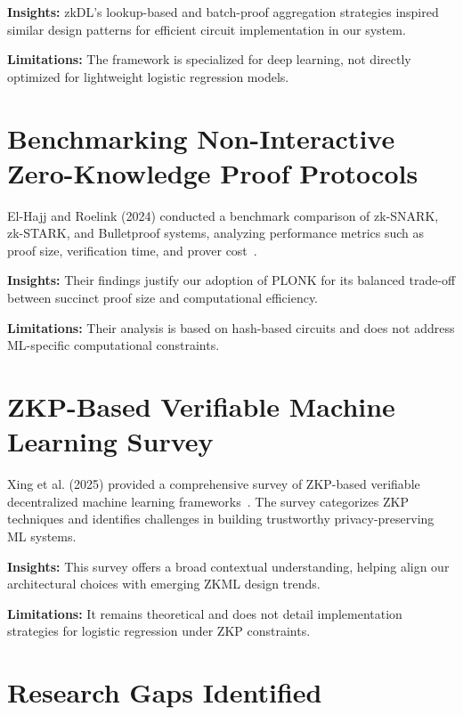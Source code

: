 \textbf{Insights:}  
zkDL’s lookup-based and batch-proof aggregation strategies inspired similar design patterns for efficient circuit implementation in our system.

\textbf{Limitations:}  
The framework is specialized for deep learning, not directly optimized for lightweight logistic regression models.

\section{Benchmarking Non-Interactive Zero-Knowledge Proof Protocols}

El-Hajj and Roelink (2024) conducted a benchmark comparison of zk-SNARK, zk-STARK, and Bulletproof systems, analyzing performance metrics such as proof size, verification time, and prover cost~\cite{info15080463}.

\textbf{Insights:}  
Their findings justify our adoption of PLONK for its balanced trade-off between succinct proof size and computational efficiency.

\textbf{Limitations:}  
Their analysis is based on hash-based circuits and does not address ML-specific computational constraints.

\section{ZKP-Based Verifiable Machine Learning Survey}

Xing et al. (2025) provided a comprehensive survey of ZKP-based verifiable decentralized machine learning frameworks~\cite{article}.  
The survey categorizes ZKP techniques and identifies challenges in building trustworthy privacy-preserving ML systems.

\textbf{Insights:}  
This survey offers a broad contextual understanding, helping align our architectural choices with emerging ZKML design trends.

\textbf{Limitations:}  
It remains theoretical and does not detail implementation strategies for logistic regression under ZKP constraints.

\section{Research Gaps Identified}

